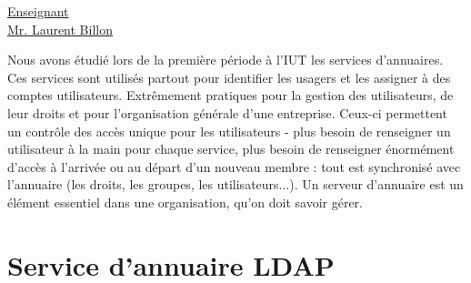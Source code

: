\renewcommand{\figurename}{}

\vspace*{0.2cm}%
      \large
      \href{\@orientadorPagina}{\color{black}Enseignant\\Mr. Laurent Billon}\\%
      \normalsize
\vspace*{0.5cm}%

Nous avons étudié lors de la première période à l'IUT les services d'annuaires. Ces services sont utilisés partout pour identifier les usagers et les assigner à des comptes utilisateurs. Extrêmement pratiques pour la gestion des utilisateurs, de leur droits et pour l'organisation générale d'une entreprise. Ceux-ci permettent un contrôle des accès unique pour les utilisateurs - plus besoin de renseigner un utilisateur à la main pour chaque service, plus besoin de renseigner énormément d'accès à l'arrivée ou au départ d'un nouveau membre : tout est synchronisé avec l'annuaire (les droits, les groupes, les utilisateurs...). Un serveur d'annuaire est un élément essentiel dans une organisation, qu'on doit savoir gérer. 

\section{Service d'annuaire LDAP}

